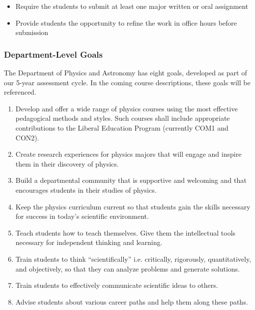\documentclass[../../main.tex]{subfiles}
\begin{document}
\begin{enumerate}
\begin{itemize}
\item Require the students to submit at least one major written or oral assignment %
\item Provide students the opportunity to refine the work in office hours before submission %
\end{itemize}

\end{enumerate}

\subsubsection{Department-Level Goals}

The Department of Physics and Astronomy has eight goals, developed as part of our 5-year assessment cycle. In the coming course descriptions, these goals will be referenced.

\begin{enumerate}
\item Develop and offer a wide range of physics courses using the most effective pedagogical methods and styles.  Such courses shall include appropriate contributions to the Liberal Education Program (currently COM1 and CON2).
\item Create research experiences for physics majors that will engage and inspire them in their discovery of physics.
\item Build a departmental community that is supportive and welcoming and that encourages students in their studies of physics.
\item Keep the physics curriculum current so that students gain the skills necessary for success in today’s scientific environment.
\item Teach students how to teach themselves. Give them the intellectual tools necessary for independent thinking and learning.
\item Train students to think ``scientifically'' i.e. critically, rigorously, quantitatively, and objectively, so that they can analyze problems and generate solutions.
\item Train students to effectively communicate scientific ideas to others.
\item Advise students about various career paths and help them along these paths.
\end{enumerate}
\end{document}
